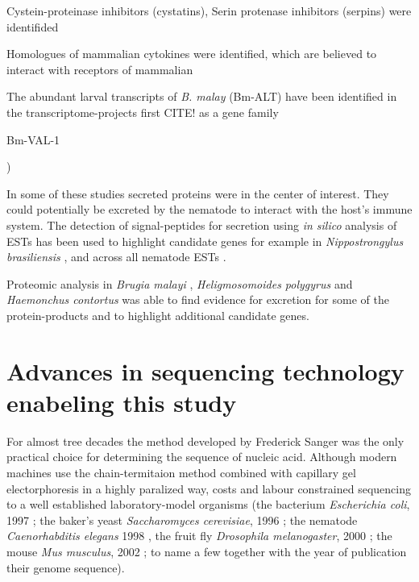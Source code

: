 Cystein-proteinase inhibitors (cystatins), Serin protenase inhibitors
(serpins) were identifided 

Homologues of mammalian cytokines were identified, which are believed
to interact with receptors of mammalian

The abundant larval transcripts of \textit{B. malay} (Bm-ALT) have
been identified in the transcriptome-projects first CITE! as a gene
family  \cite{gomez-escobar_abundant_2002}

Bm-VAL-1

\cite{blaxter_genes_1996, daub_survey_2000,
  parkinson_transcriptomic_2004, mitreva_gene_2004})

In some of these studies secreted proteins were in the center of
interest. They could potentially be excreted by the nematode to
interact with the host's immune system. The detection of
signal-peptides for secretion using \textit{in silico} analysis of
ESTs has been used to highlight candidate genes for example in
\textit{Nippostrongylus brasiliensis} \cite{harcus_signal_2004}, and
across all nematode ESTs \cite{nagaraj_needles_2008}.

Proteomic analysis in \textit{Brugia malayi}
\cite{pmid19352421,pmid18958170}, \textit{Heligmosomoides polygyrus}
\cite{pmid21722761} and \textit{Haemonchus contortus}
\cite{pmid12576473} was able to find evidence for excretion for some
of the protein-products and to highlight additional candidate genes.



\section{Advances in sequencing technology enabeling this study}
\label{ad-seq}

For almost tree decades the method developed by Frederick Sanger
\cite{pmid271968} was the only practical choice for determining the
sequence of nucleic acid. Although modern machines use the
chain-termitaion method combined with capillary gel electorphoresis
\cite{pmid2326186} in a highly paralized way, costs and labour
constrained sequencing to a well established laboratory-model
organisms (the bacterium \textit{Escherichia coli}, 1997
\cite{pmid9278503}; the baker's yeast \textit{Saccharomyces
  cerevisiae}, 1996 \cite{pmid8849441}; the nematode
\textit{Caenorhabditis elegans} 1998 \cite{pmid9851916}, the fruit fly
\textit{Drosophila melanogaster}, 2000 \cite{adams2000genome}; the
mouse \textit{Mus musculus}, 2002 \cite{pmid12466850}; to name a few
together with the year of publication their genome sequence).

